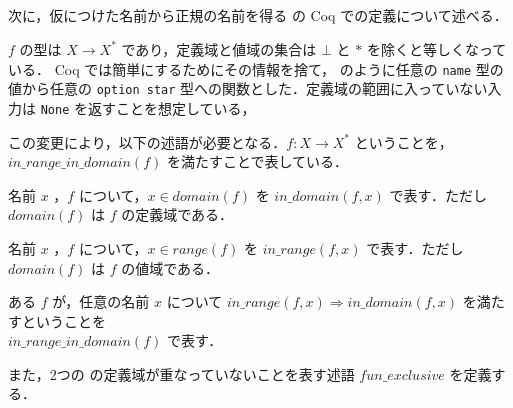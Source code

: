 


\subsection{\tmp}

次に，仮につけた名前から正規の名前を得る \tmp の Coq での定義について述べる．

\tmp $ f $ の型は $X \rightarrow X^* $ であり，定義域と値域の集合は $\bot$ と $\ast$ を除くと等しくなっている．
Coq では簡単にするためにその情報を捨て， のように任意の {\tt name} 型の値から任意の {\tt option star} 型への関数とした．定義域の範囲に入っていない入力は {\tt None} を返すことを想定している，

この変更により，以下の述語が必要となる．$f : X \rightarrow X^*$ ということを，$in\_range\_in\_domain(f)$ を満たすことで表している．

\begin{dfn}[$in\_domain$]
  名前 $x$ ，\tmp $f$ について，$x \in domain(f)$ を $in\_domain(f,x)$ で表す．ただし $domain(f)$ は $f$ の定義域である．
\end{dfn}

\begin{dfn}[$in\_range$]
  名前 $x$ ，\tmp $f$ について，$x \in range(f)$ を $in\_range(f,x)$ で表す．ただし $domain(f)$ は $f$ の値域である．
\end{dfn}

\begin{dfn}
  ある \tmp $f$ が，任意の名前 $x$ について $in\_range(f, x) \Rightarrow in\_domain(f, x)$ を満たすということを \\
  $in\_range\_in\_domain(f)$ で表す．
\end{dfn}


また，2つの \tmp の定義域が重なっていないことを表す述語 $fun\_exclusive$ を定義する．

